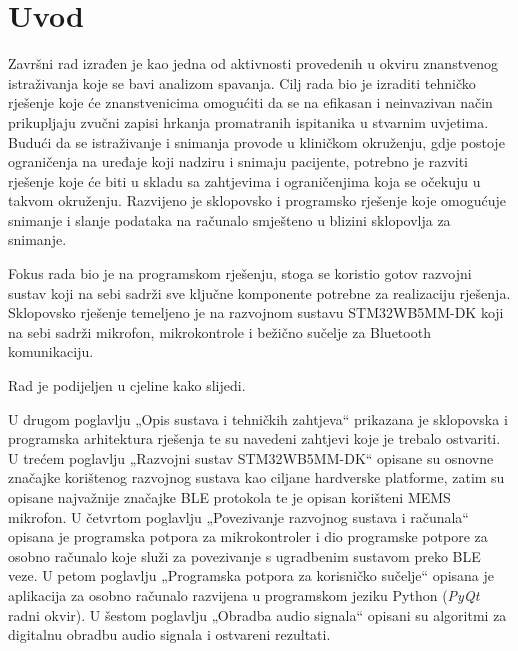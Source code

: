 \chapter{Uvod}

Završni rad izrađen je kao jedna od aktivnosti provedenih u okviru znanstvenog istraživanja koje se bavi analizom spavanja. Cilj rada bio je izraditi tehničko rješenje koje će znanstvenicima omogućiti da se na efikasan i neinvazivan način prikupljaju zvučni zapisi hrkanja promatranih ispitanika u stvarnim uvjetima. Budući da se istraživanje i snimanja provode u kliničkom okruženju, gdje postoje ograničenja na uređaje koji nadziru i snimaju pacijente, potrebno je razviti rješenje koje će biti u skladu sa zahtjevima i ograničenjima koja se očekuju u takvom okruženju. Razvijeno je sklopovsko i programsko rješenje koje omogućuje snimanje i slanje podataka na računalo smješteno u blizini sklopovlja za snimanje.

Fokus rada bio je na programskom rješenju, stoga se koristio gotov razvojni sustav koji na sebi sadrži sve ključne komponente potrebne za realizaciju rješenja. Sklopovsko rješenje temeljeno je na razvojnom sustavu STM32WB5MM-DK koji na sebi sadrži mikrofon, mikrokontrole i bežično sučelje za Bluetooth komunikaciju.

Rad je podijeljen u cjeline kako slijedi.

U drugom poglavlju „Opis sustava i tehničkih zahtjeva“ prikazana je sklopovska i programska arhitektura rješenja te su navedeni zahtjevi koje je trebalo ostvariti. U trećem poglavlju „Razvojni sustav STM32WB5MM-DK“ opisane su osnovne značajke korištenog razvojnog sustava kao ciljane hardverske platforme, zatim su opisane najvažnije značajke BLE protokola te je opisan korišteni MEMS mikrofon. U četvrtom poglavlju „Povezivanje razvojnog sustava i računala“ opisana je programska potpora za mikrokontroler i dio programske potpore za osobno računalo koje služi za povezivanje s ugradbenim sustavom preko BLE veze. U petom poglavlju „Programska potpora za korisničko sučelje“ opisana je aplikacija za osobno računalo razvijena u programskom jeziku Python (\textit{PyQt} radni okvir). U šestom poglavlju „Obradba audio signala“ opisani su algoritmi za digitalnu obradbu audio signala i ostvareni rezultati.



\eject